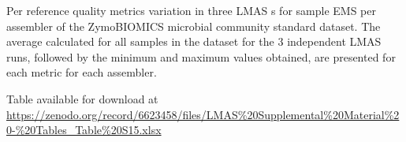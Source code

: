 \begin{table}[]
\centering
\caption{Per reference quality metrics variation in three LMAS s for sample EMS per assembler of the ZymoBIOMICS microbial community standard dataset. The average calculated for all samples in the dataset for the 3 independent LMAS runs, followed by the minimum and maximum values obtained, are presented for each metric for each assembler.}
\label{tab:ch5_suptable15}
Table available for download at \url{https://zenodo.org/record/6623458/files/LMAS\%20Supplemental\%20Material\%20-\%20Tables_Table\%20S15.xlsx}
\end{table}